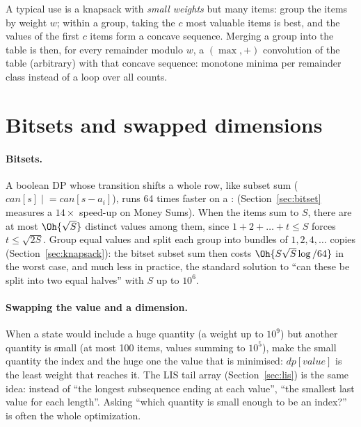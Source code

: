 
A typical use is a knapsack with \emph{small weights} but many items: group the items by weight $w$; within a group, taking the $c$
most valuable items is best, and the values of the first $c$ items form a concave sequence. Merging a group into the table is then,
for every remainder modulo $w$, a $(\max, +)$ convolution of the table (arbitrary) with that concave sequence: monotone minima per
remainder class instead of a loop over all counts.

\section[Bitsets and swapped dimensions]{Bitsets and swapped dimensions \hfill \gold}\label{sec:dpopt-bitset}

\paragraph{Bitsets.} A boolean DP whose transition shifts a whole row, like subset sum ($\mathit{can}[s] \mathrel{|}= \mathit{can}[s
- a_i]$), runs 64 times faster on a :  (Section~\ref{sec:bitset} measures a $14\times$ speed-up on Money
Sums). When the items sum to $S$, there are at most $\Oh{\sqrt S}$ distinct values among them, since $1 + 2 + \dots + t \le S$
forces $t \le \sqrt{2S}$. Group equal values and split each group into bundles of $1, 2, 4, \dots$ copies (Section~\ref{sec:knapsack}):
the bitset subset sum then costs $\Oh{S \sqrt S \log / 64}$ in the worst case, and much less in practice, the standard solution to
``can these be split into two equal halves'' with $S$ up to $10^6$.


\paragraph{Swapping the value and a dimension.} When a state would include a huge quantity (a weight up to $10^9$) but another
quantity is small (at most 100 items, values summing to $10^5$), make the small quantity the index and the huge one the value that is
minimised: $dp[\mathit{value}]$ is the least weight that reaches it. The LIS tail array (Section~\ref{sec:lis}) is the same idea:
instead of ``the longest subsequence ending at each value'', ``the smallest last value for each length''. Asking ``which quantity is
small enough to be an index?'' is often the whole optimization.

